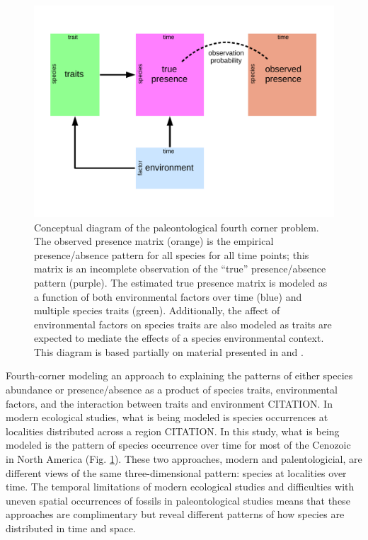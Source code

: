 \documentclass[12pt,letterpaper]{article}
\begin{document}



\begin{figure}[ht]
  \centering
  \includegraphics[width=\textwidth,height=0.8\textheight,keepaspectratio=true]{figure/paleo_fourth_corner}
  \caption[Conceptual diagram of the paleontological fourth-courner problem]{Conceptual diagram of the paleontological fourth corner problem. The observed presence matrix (orange) is the empirical presence/absence pattern for all species for all time points; this matrix is an incomplete observation of the ``true'' presence/absence pattern (purple). The estimated true presence matrix is modeled as a function of both environmental factors over time (blue) and multiple species traits (green). Additionally, the affect of environmental factors on species traits are also modeled as traits are expected to mediate the effects of a species environmental context. This diagram is based partially on material presented in \citet{Brown2014c} and \citet{Warton2015a}.}
  \label{fig:concept_fourth_corner}
\end{figure}

Fourth-corner modeling an approach to explaining the patterns of either species abundance or presence/absence as a product of species traits, environmental factors, and the interaction between traits and environment CITATION. In modern ecological studies, what is being modeled is species occurrences at localities distributed across a region CITATION. In this study, what is being modeled is the pattern of species occurrence over time for most of the Cenozoic in North America (Fig. \ref{fig:concept_fourth_corner}). These two approaches, modern and palentologicial, are different views of the same three-dimensional pattern: species at localities over time. The temporal limitations of modern ecological studies and difficulties with uneven spatial occurrences of fossils in paleontological studies means that these approaches are complimentary but reveal different patterns of how species are distributed in time and space.
\end{document}
